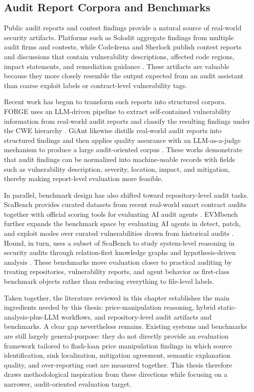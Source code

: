 \subsection{Audit Report Corpora and Benchmarks}

Public audit reports and contest findings provide a natural source of real-world
security artifacts. Platforms such as Solodit aggregate findings from multiple
audit firms and contests, while Code4rena and Sherlock publish contest reports
and discussions that contain vulnerability descriptions, affected code regions,
impact statements, and remediation guidance \citep{solodit,code4rena,sherlock}.
These artifacts are valuable because they more closely resemble the output
expected from an audit assistant than coarse exploit labels or contract-level
vulnerability tags.

Recent work has begun to transform such reports into structured corpora. FORGE
uses an LLM-driven pipeline to extract self-contained vulnerability information
from real-world audit reports and classify the resulting findings under the CWE
hierarchy \citep{forge}. GiAnt likewise distills real-world audit reports into
structured findings and then applies quality assurance with an LLM-as-a-judge
mechanism to produce a large audit-oriented corpus \citep{giant}. These works
demonstrate that audit findings can be normalized into machine-usable records
with fields such as vulnerability description, severity, location, impact, and
mitigation, thereby making report-level evaluation more feasible.

In parallel, benchmark design has also shifted toward repository-level audit
tasks. ScaBench provides curated datasets from recent real-world smart contract
audits together with official scoring tools for evaluating AI audit agents
\citep{scabench}. EVMbench further expands the benchmark space by evaluating AI
agents in detect, patch, and exploit modes over curated vulnerabilities drawn
from historical audits \citep{evmbench}. Hound, in turn, uses a subset of
ScaBench to study system-level reasoning in security audits through
relation-first knowledge graphs and hypothesis-driven analysis
\citep{hound}. These benchmarks move evaluation closer to practical auditing by
treating repositories, vulnerability reports, and agent behavior as first-class
benchmark objects rather than reducing everything to file-level labels.

Taken together, the literature reviewed in this chapter establishes the main
ingredients needed by this thesis: price-manipulation reasoning, hybrid
static-analysis-plus-LLM workflows, and repository-level audit artifacts and
benchmarks. A clear gap nevertheless remains. Existing systems and benchmarks
are still largely general-purpose: they do not directly provide an evaluation
framework tailored to flash-loan price manipulation findings in which source
identification, sink localization, mitigation agreement, semantic explanation
quality, and over-reporting cost are measured together. This thesis therefore
draws methodological inspiration from these directions while focusing on a
narrower, audit-oriented evaluation target.
